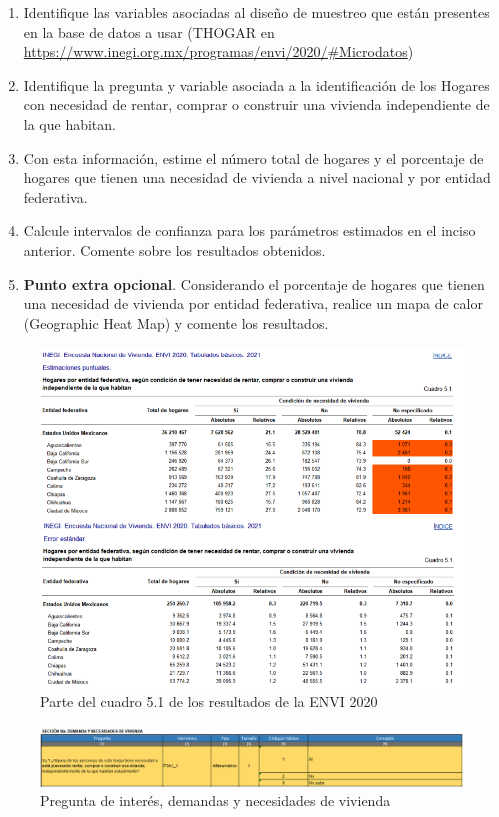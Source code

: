 \documentclass[
]{article}
\providecommand{\tightlist}{%
  \setlength{\itemsep}{0pt}\setlength{\parskip}{0pt}}
\begin{document}
\begin{enumerate}
\def\labelenumi{\roman{enumi}.}
\tightlist
\item
  Identifique las variables asociadas al diseño de muestreo que están
  presentes en la base de datos a usar (THOGAR en
  \url{https://www.inegi.org.mx/programas/envi/2020/\#Microdatos})
\item
  Identifique la pregunta y variable asociada a la identificación de los
  Hogares con necesidad de rentar, comprar o construir una vivienda
  independiente de la que habitan.
\item
  Con esta información, estime el número total de hogares y el
  porcentaje de hogares que tienen una necesidad de vivienda a nivel
  nacional y por entidad federativa.
\item
  Calcule intervalos de confianza para los parámetros estimados en el
  inciso anterior. Comente sobre los resultados obtenidos.
\item
  \textbf{Punto extra opcional}. Considerando el porcentaje de hogares
  que tienen una necesidad de vivienda por entidad federativa, realice
  un mapa de calor (Geographic Heat Map) y comente los resultados.
\end{enumerate}

\begin{figure}[H]
\centering
    \includegraphics[width=160mm]{images/ENVI2020.png}
    \caption{Parte del cuadro 5.1 de los resultados de la ENVI 2020}
    \label{Envi2020}
\end{figure}

\begin{figure}[H]
\centering
    \includegraphics[width=160mm]{images/enc.png}
    \caption{Pregunta de interés, demandas y necesidades de vivienda}
    \label{Pregunta de interés}
\end{figure}
\end{document}
